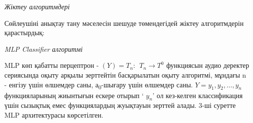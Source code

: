 
\emph{Жіктеу алгоритмдері}

Сөйлеушіні анықтау тану мәселесін шешуде төмендегідей жіктеу
алгоритмдерін қарастырдық:

\emph{MLP Classifier алгоритмі}

MLP көп қабатты перцептрон -
\((Y) = T_{n}:{\ \ T}_{n} \rightarrow T^{0}\) функциясын аудио деректер
сериясында оқыту арқылы зерттейтін басқарылатын оқыту алгоритмі, мұндағы
n - енгізу үшін өлшемдер саны, а\textsubscript{0}-шығару үшін өлшемдер
саны. \(Y = y_{1},y_{2},\ldots,y_{n}\) функцияларының жиынтығын ескере
отырып ` \(y_{n}\)' ол кез-келген классификация үшін сызықтық емес
функциялардың жуықтауын зерттей алады. 3-ші суретте MLP архитектурасы
көрсетілген.


